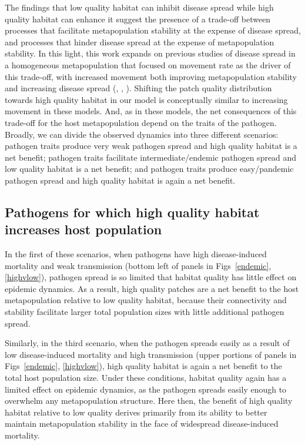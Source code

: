 \documentclass{article}
\begin{document}
The findings that low quality habitat can inhibit disease spread while high quality habitat can enhance it suggest the presence of a trade-off between processes that facilitate metapopulation stability at the expense of disease spread, and processes that hinder disease spread at the expense of metapopulation stability.
In this light, this work expands on previous studies of disease spread in a homogeneous metapopulation that focused on movement rate as the driver of this trade-off, with increased movement both improving metapopulation stability and increasing disease spread (\cite{Hess1996}, \cite{Gog2002}, \cite{Park2012}).  
Shifting the patch quality distribution towards high quality habitat in our model is  conceptually similar to increasing movement in these models.
And, as in these models, the net consequences of this trade-off for the host metapopulation depend on the traits of the pathogen.
Broadly, we can divide the observed dynamics into three different scenarios: pathogen traits produce very weak pathogen spread and high quality habitat is a net benefit; pathogen traits facilitate intermediate/endemic pathogen spread and low quality habitat is a net benefit; and pathogen traits produce easy/pandemic pathogen spread and high quality habitat is again a net benefit.  

\subsection*{Pathogens for which high quality habitat increases host population}

In the first of these scenarios, when pathogens have high disease-induced mortality and weak transmission (bottom left of panels in Figs~\ref{endemic}, \ref{highvlow}), pathogen spread is so limited that habitat quality has little effect on epidemic dynamics.
As a result, high quality patches are a net benefit to the host metapopulation relative to low quality habitat, because their connectivity and stability facilitate larger total population sizes with little additional pathogen spread.

Similarly, in the third scenario, when the pathogen spreads easily as a result of low disease-induced mortality and high transmission (upper portions of panels in Figs~\ref{endemic}, \ref{highvlow}), high quality habitat is again a net benefit to the total host population size.  
Under these conditions, habitat quality again has a limited effect on epidemic dynamics, as the pathogen spreads easily enough to overwhelm any metapopulation structure.
Here then, the benefit of high quality habitat relative to low quality derives primarily from its ability to better maintain metapopulation stability in the face of widespread disease-induced mortality.
\end{document}
